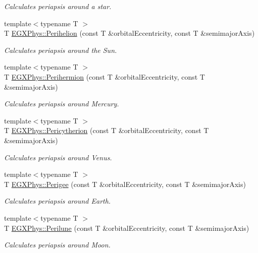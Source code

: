 \begin{DoxyCompactItemize}
\begin{DoxyCompactList}\small\item\em Calculates periapsis around a star. \end{DoxyCompactList}\item 
{\footnotesize template$<$typename T $>$ }\\T \hyperlink{group___astrophysics_ga941d285e3a0b48ada9c9f60925ff63c2}{E\+G\+X\+Phys\+::\+Perihelion} (const T \&orbital\+Eccentricity, const T \&semimajor\+Axis)
\begin{DoxyCompactList}\small\item\em Calculates periapsis around the Sun. \end{DoxyCompactList}\item 
{\footnotesize template$<$typename T $>$ }\\T \hyperlink{group___astrophysics_ga9562e9cbfd73019ae9cdaa643b843d63}{E\+G\+X\+Phys\+::\+Perihermion} (const T \&orbital\+Eccentricity, const T \&semimajor\+Axis)
\begin{DoxyCompactList}\small\item\em Calculates periapsis around Mercury. \end{DoxyCompactList}\item 
{\footnotesize template$<$typename T $>$ }\\T \hyperlink{group___astrophysics_gaa270e364cbbd7d3d6212872df484926f}{E\+G\+X\+Phys\+::\+Pericytherion} (const T \&orbital\+Eccentricity, const T \&semimajor\+Axis)
\begin{DoxyCompactList}\small\item\em Calculates periapsis around Venus. \end{DoxyCompactList}\item 
{\footnotesize template$<$typename T $>$ }\\T \hyperlink{group___astrophysics_gae2d053caf69cb0b4c3207064a2ab143a}{E\+G\+X\+Phys\+::\+Perigee} (const T \&orbital\+Eccentricity, const T \&semimajor\+Axis)
\begin{DoxyCompactList}\small\item\em Calculates periapsis around Earth. \end{DoxyCompactList}\item 
{\footnotesize template$<$typename T $>$ }\\T \hyperlink{group___astrophysics_ga2cc7ab05e18d32c94d8d74972e032793}{E\+G\+X\+Phys\+::\+Perilune} (const T \&orbital\+Eccentricity, const T \&semimajor\+Axis)
\begin{DoxyCompactList}\small\item\em Calculates periapsis around Moon. \end{DoxyCompactList}\item 

\end{DoxyCompactItemize}
